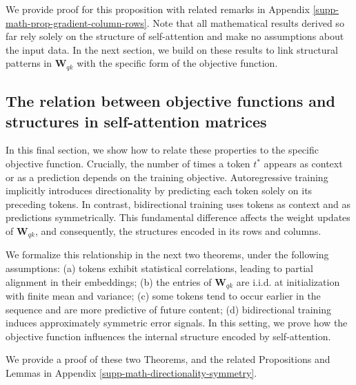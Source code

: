 %
We provide proof for this proposition with related remarks in Appendix \ref{supp-math-prop-gradient-column-rows}.
%
 Note that all mathematical results derived so far rely solely on the structure of self-attention and make no assumptions about the input data.   
%
In the next section, we build on these results to link structural patterns in \( \bm{W}_{qk} \) with the specific form of the objective function.


\subsection{The relation between objective functions and structures in self-attention matrices}
%
In this final section, we show how to relate these properties to the specific objective function.
%
Crucially, the number of times a token \( t^* \) appears as context or as a prediction depends on the training objective.
%
Autoregressive training implicitly introduces directionality by predicting each token solely on its preceding tokens. 
%
In contrast, bidirectional training uses tokens as context and as predictions symmetrically.
%
This fundamental difference affects the weight updates of \( \bm{W}_{qk} \), and consequently, the structures encoded in its rows and columns.
%

We formalize this relationship in the next two theorems, under the following assumptions:  (a) tokens exhibit statistical correlations, leading to partial alignment in their embeddings; (b) the entries of \( \bm{W}_{qk} \) are i.i.d. at initialization with finite mean and variance; (c) some tokens tend to occur earlier in the sequence and are more predictive of future content; (d) bidirectional training induces approximately symmetric error signals.
%
In this setting, we prove how the objective function influences the internal structure encoded by self-attention.
%

%


%
We provide a proof of these two Theorems, and the related Propositions and Lemmas in Appendix \ref{supp-math-directionality-symmetry}.
%